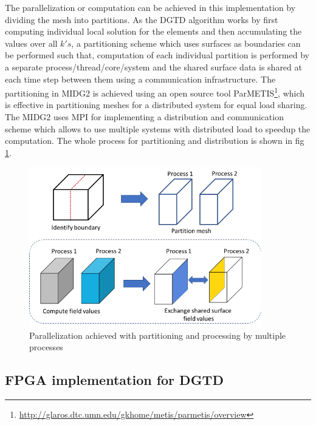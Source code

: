 The parallelization or computation can be achieved in this implementation by dividing
the mesh into partitions. As the \ac{DGTD} algorithm works by first computing individual
local solution for the elements and then accumulating the values over all $k's$,
a partitioning scheme which uses surfaces as boundaries can be performed such that,
computation of each individual partition is performed by a separate
process/thread/core/system and the shared surface data is shared at each time step
between them using a communication infrastructure. The partitioning in MIDG2 is
achieved using an open source tool ParMETIS\footnote{\url{http://glaros.dtc.umn.edu/gkhome/metis/parmetis/overview}},
which is effective in partitioning meshes for a distributed system for equal load sharing.
The MIDG2 uses \ac{MPI} for implementing a distribution and communication scheme which
allows to use multiple systems with distributed load to speedup the computation.
The whole process for partitioning and distribution is shown in fig \ref{fig:partitioning}.
\begin{figure}[h]%
    \centering
    \includegraphics[width=0.9\textwidth]{images/partition_proc}
    \caption{Parallelization achieved with partitioning and processing by multiple processes}
    \label{fig:partitioning}
\end{figure}

\subsection{FPGA implementation for DGTD}
\label{sec:fpga_dg}

